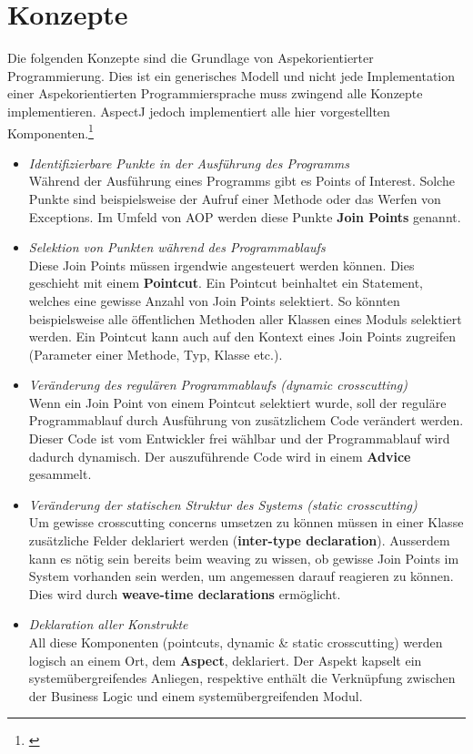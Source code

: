 \section{Konzepte}
\label{sec:aop_concepts}

Die folgenden Konzepte sind die Grundlage von Aspekorientierter Programmierung. Dies ist ein generisches Modell und nicht jede Implementation einer Aspekorientierten Programmiersprache muss zwingend alle Konzepte implementieren. AspectJ jedoch implementiert alle hier vorgestellten Komponenten.\footnote{\cite[p~58]{laddad:aspectj}}

\begin{itemize}
\item \textit{Identifizierbare Punkte in der Ausführung des Programms} \\ Während der Ausführung eines Programms gibt es Points of Interest. Solche Punkte sind beispielsweise der Aufruf einer Methode oder das Werfen von Exceptions. Im Umfeld von AOP werden diese Punkte \textbf{Join Points} genannt. 
\item \textit{Selektion von Punkten während des Programmablaufs}\\ Diese Join Points müssen irgendwie angesteuert werden können. Dies geschieht mit einem \textbf{Pointcut}. Ein Pointcut beinhaltet ein Statement, welches eine gewisse Anzahl von Join Points selektiert. So könnten beispielsweise alle öffentlichen Methoden aller Klassen eines Moduls selektiert werden. Ein Pointcut kann auch auf den Kontext eines Join Points zugreifen (Parameter einer Methode, Typ, Klasse etc.).
\item \textit{Veränderung des regulären Programmablaufs (dynamic crosscutting)}\\
Wenn ein Join Point von einem Pointcut selektiert wurde, soll der reguläre Programmablauf durch Ausführung von zusätzlichem Code verändert werden. Dieser Code ist vom Entwickler frei wählbar und der Programmablauf wird dadurch dynamisch. Der auszuführende Code wird in einem \textbf{Advice} gesammelt.
\item \textit{Veränderung der statischen Struktur des Systems (static crosscutting)}\\
Um gewisse crosscutting concerns umsetzen zu können müssen in einer Klasse zusätzliche Felder deklariert werden (\textbf{inter-type declaration}). Ausserdem kann es nötig sein bereits beim weaving zu wissen, ob gewisse Join Points im System vorhanden sein werden, um angemessen darauf reagieren zu können. Dies wird durch \textbf{weave-time declarations} ermöglicht.

\item \textit{Deklaration aller Konstrukte}\\
All diese Komponenten (pointcuts, dynamic \& static crosscutting) werden logisch an einem Ort, dem \textbf{Aspect}, deklariert. Der Aspekt kapselt ein systemübergreifendes Anliegen, respektive enthält die Verknüpfung zwischen der Business Logic und einem systemübergreifenden Modul. 
\end{itemize}

